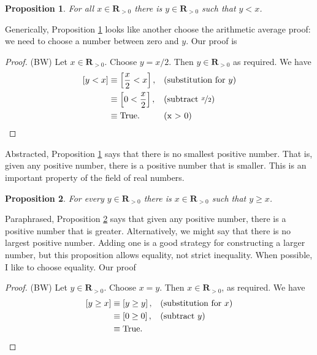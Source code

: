 \documentclass[12pt,fleqn,answers]{article}
\newcommand{\reals}{\mathbf{R}}
\newcommand{\true}{\mathrm{True}}
\newenvironment{myproof}
  {\begin{shaded}\begin{proof}}
  {\end{proof}\end{shaded}}
\newtheorem{prop}{Proposition}
\begin{document}
    \begin{prop}   For all $x \in \reals_{>0}$ there is 
      $y \in \reals_{> 0}$ such that $y < x$.  \label{p3}
    \end{prop}
     
    \noindent Generically, Proposition \ref{p3} looks like another choose the arithmetic average proof: we need to choose a number between zero and $y$. Our proof is
      
      \begin{myproof} (BW) Let $x \in \reals_{>0}$. Choose $y = x/2$. Then $y \in \reals_{>0}$ as required. We have
         \begin{align*}
         \left[y < x \right] &\equiv \left[\frac{x}{2} < x \right], &&\text{(substitution for $y$)} \\
                                   &\equiv \left[0 < \frac{x}{2}  \right], &&\text{(subtract $\nicefrac{x}{2}$)} \\
                                   &\equiv \true.  &&\text{(x > 0)} \qedhere
      \end{align*}
      \end{myproof}
\noindent Abstracted, Proposition \ref{p3} says that there is no smallest positive number. That is, given any positive number, there is a 
positive number that is smaller.  This is an important property of the field of real numbers.
       

       \begin{prop} For every $y \in \reals_{> 0}$ there is  
        $x \in \reals_{>0}$ such that $y \geq  x$. \label{p4}
      \end{prop}
      \noindent Paraphrased, Proposition \ref{p4} says that given any positive number, there is a positive number that is greater. Alternatively, we
      might say that there is no largest positive number. Adding one is a good strategy for constructing a larger number, but this proposition
      allows equality, not strict inequality.  When possible, I like to choose equality. Our proof
      
       \begin{myproof} (BW) Let $y \in \reals_{>0}$. Choose $x = y$. Then $x \in \reals_{>0}$, as 
        required. We have
       \begin{align*}
         \left[y \geq x  \right] &\equiv \left[y \geq  y \right], && \text{(substitution for $x$)} \\
                                      &\equiv \left[0 \geq 0 \right], &&\text{(subtract $y$)} \\
                                      &\equiv \true. && \qedhere
       \end{align*}
       
       \end{myproof}
\end{document}
